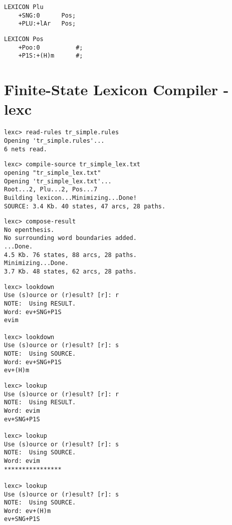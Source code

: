 \documentclass[11pt,a4paper]{article}
\begin{document}
\begin{lstlisting}[title={Pos follows Plu}, belowskip=1em,frame=single]
LEXICON Plu
    +SNG:0      Pos;
    +PLU:+lAr   Pos;
\end{lstlisting}

\begin{lstlisting}[title={Pos is the final state}, belowskip=1em,frame=single]
LEXICON Pos
    +Poo:0          #;
    +P1S:+(H)m      #;
\end{lstlisting}



\section{Finite-State Lexicon Compiler - lexc}
\label{sec:lexc}

\begin{lstlisting}[caption={Read the transducer you saved before}, belowskip=1em,frame=single]
lexc> read-rules tr_simple.rules
Opening 'tr_simple.rules'...
6 nets read.
\end{lstlisting}

\begin{lstlisting}[caption={Read the lexicon file}, belowskip=1em,frame=single]
lexc> compile-source tr_simple_lex.txt
opening "tr_simple_lex.txt"
Opening 'tr_simple_lex.txt'...
Root...2, Plu...2, Pos...7
Building lexicon...Minimizing...Done!
SOURCE: 3.4 Kb. 40 states, 47 arcs, 28 paths.
\end{lstlisting}

\begin{lstlisting}[caption={Combine lexicon and rules}, belowskip=1em,frame=single]
lexc> compose-result
No epenthesis.
No surrounding word boundaries added.
...Done.
4.5 Kb. 76 states, 88 arcs, 28 paths.
Minimizing...Done.
3.7 Kb. 48 states, 62 arcs, 28 paths.
\end{lstlisting}

\begin{lstlisting}[caption={Test your work, notice the difference between result \& source}, belowskip=1em,frame=single]
lexc> lookdown
Use (s)ource or (r)esult? [r]: r
NOTE:  Using RESULT.
Word: ev+SNG+P1S
evim

lexc> lookdown
Use (s)ource or (r)esult? [r]: s
NOTE:  Using SOURCE.
Word: ev+SNG+P1S
ev+(H)m

\end{lstlisting}

\begin{lstlisting}[belowskip=1em,frame=single]
lexc> lookup
Use (s)ource or (r)esult? [r]: r
NOTE:  Using RESULT.
Word: evim
ev+SNG+P1S

lexc> lookup
Use (s)ource or (r)esult? [r]: s
NOTE:  Using SOURCE.
Word: evim
****************

lexc> lookup
Use (s)ource or (r)esult? [r]: s
NOTE:  Using SOURCE.
Word: ev+(H)m
ev+SNG+P1S
\end{lstlisting}
\end{document}
